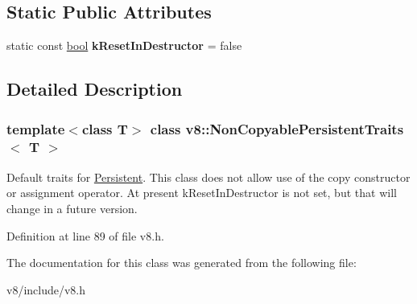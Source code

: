 \subsection*{Static Public Attributes}
\begin{DoxyCompactItemize}
\item 
\mbox{\label{classv8_1_1NonCopyablePersistentTraits_a650880d85ff80634c30a195d20329681}} 
static const \mbox{\hyperlink{classbool}{bool}} {\bfseries k\+Reset\+In\+Destructor} = false
\end{DoxyCompactItemize}


\subsection{Detailed Description}
\subsubsection*{template$<$class T$>$\newline
class v8\+::\+Non\+Copyable\+Persistent\+Traits$<$ T $>$}

Default traits for \mbox{\hyperlink{classv8_1_1Persistent}{Persistent}}. This class does not allow use of the copy constructor or assignment operator. At present k\+Reset\+In\+Destructor is not set, but that will change in a future version. 

Definition at line 89 of file v8.\+h.



The documentation for this class was generated from the following file\+:\begin{DoxyCompactItemize}
\item 
v8/include/v8.\+h\end{DoxyCompactItemize}

